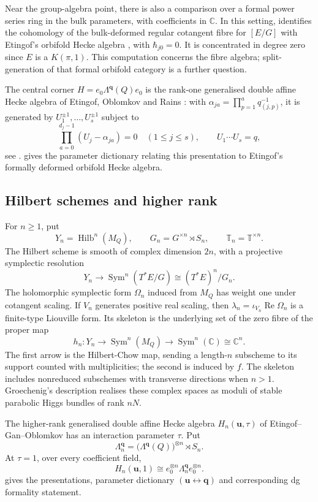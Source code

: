 \documentclass[a4paper]{amsart}
\newcommand{\C}{\mathbb{C}}
\DeclareMathOperator{\Ree}{Re}
\numberwithin{equation}{section}
\begin{document}
Near the group-algebra point, there is also a comparison over a
formal power series ring in the bulk parameters, with coefficients
in $\C$. In this setting, \cite[Theorem~1.6 and Example~7.4]{HKTY}
identifies the cohomology of the bulk-deformed regular cotangent
fibre for $[E/G]$ with Etingof's orbifold Hecke algebra
\cite{EtingofOrbifold}, with $\hbar_{j0}=0$. It is concentrated
in degree zero since $E$ is a $K(\pi,1)$. This computation concerns
the fibre algebra; split-generation of that formal orbifold
category is a further question.

The central corner $H=e_0\Lambda^{\boldsymbol q}(Q)e_0$ is the rank-one
generalised double affine Hecke algebra of Etingof, Oblomkov and Rains
\cite{EOR}: with $\alpha_{ja}=\prod_{p=1}^{a}q_{(j,p)}^{-1}$, it is
generated by $U_1^{\pm1},\ldots,U_s^{\pm1}$ subject to
\[
 \prod_{a=0}^{d_j-1}(U_j-\alpha_{ja})=0\quad(1\le j\le s),\qquad
 U_1\cdots U_s=q,
\]
see .  gives the
parameter dictionary relating this presentation to Etingof's formally
deformed orbifold Hecke algebra.

\subsection{Hilbert schemes and higher rank}

For $n\ge1$, put
\[
 Y_n=\operatorname{Hilb}^n(M_Q),\qquad
 G_n=G^{\times n}\rtimes S_n,\qquad \mathbb{T}_n=\mathbb{T}^{\times n}.
\]
The Hilbert scheme is smooth of complex dimension $2n$, with a
projective symplectic resolution
\[
 Y_n\longrightarrow\operatorname{Sym}^n(T^*E/G)
       \cong (T^*E)^n/G_n.
\]
The holomorphic symplectic form $\Omega_n$ induced from $M_Q$
has weight one under cotangent scaling. If $V_n$ generates positive
real scaling, then $\lambda_n=\iota_{V_n}\Ree\Omega_n$ is a
finite-type Liouville form. Its skeleton is the underlying set of
the zero fibre of the proper map
\[
 h_n:Y_n\longrightarrow\operatorname{Sym}^n(M_Q)
          \longrightarrow\operatorname{Sym}^n(\C)\cong\C^n.
\]
The first arrow is the Hilbert-Chow map, sending a length-$n$
subscheme to its support counted with multiplicities; the second is
induced by $f$. The skeleton includes nonreduced subschemes with
transverse directions when $n>1$. Groechenig's description
\cite[Theorems~4.1 and~5.1]{Groechenig} realises these complex
spaces as moduli of stable parabolic Higgs bundles of rank $nN$.

The higher-rank generalised double affine Hecke algebra
$H_n(\boldsymbol u,\tau)$ of Etingof--Gan--Oblomkov \cite{EGO}
has an interaction parameter $\tau$. Put
\[
 \Lambda_n^{\boldsymbol q}
   =\bigl(\Lambda^{\boldsymbol q}(Q)\bigr)^{\otimes n}\rtimes S_n.
\]
At $\tau=1$, over every coefficient field,
\begin{equation}\label{eq:higher-noninteracting}
 H_n(\boldsymbol u,1)
   \cong e_0^{\otimes n}\Lambda_n^{\boldsymbol q}e_0^{\otimes n}.
\end{equation}
 gives the presentations, parameter dictionary
$(\boldsymbol u\leftrightarrow\boldsymbol q)$ and corresponding dg
formality statement.
\end{document}
